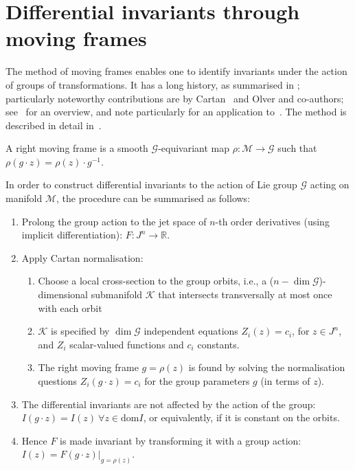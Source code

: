 \documentclass[review,onefignum,onetabnum]{siamonline190516}
\begin{document}
\section{Differential invariants through moving frames}

The method of moving frames enables one to identify invariants under the action of groups of transformations. It has a long history, as summarised in \cite{Olver14}; particularly noteworthy contributions are by Cartan~\cite{Cartan37} and Olver and co-authors; see~\cite{Olver14} for an overview, and note particularly for an application to~\cite{Calabi98}. The method is described in detail in~\cite{OlverCIT}.

A right moving frame is a smooth $\mathcal{G}$-equivariant map $\rho : \mathcal{M} \to \mathcal{G}$ such that $\rho (g \cdot z) = \rho(z) \cdot g^{-1}$. 

In order to construct differential invariants to the action of Lie group $\mathcal{G}$ acting on manifold $\mathcal{M}$, the procedure can be summarised as follows:

\begin{enumerate}
\item Prolong the group action to the jet space of $n$-th order derivatives (using implicit differentiation): $F: J^n \to \mathbb{R}$. 
\item Apply Cartan normalisation:
    \begin{enumerate}
    \item Choose a local cross-section to the group orbits, i.e., a ($n - \dim \mathcal{G}$)-dimensional submanifold $\mathcal{K}$ that intersects transversally at most once with each orbit
    \item $\mathcal{K}$ is specified by $\dim \mathcal{G}$ independent equations $Z_i (z) = c_i$, for $z \in J^n$,  and $Z_i$ scalar-valued functions and $c_i$ constants.
    \item The right moving frame $g = \rho(z)$ is found by solving the normalisation questions $Z_i (g \cdot z) = c_i$ for the group parameters $g$ (in terms of $z$).
    \end{enumerate}
\item The differential invariants are not affected by the action of the group: $I(g \cdot z) = I(z) \: \forall z \in \mathrm{dom} I$, or equivalently, if it is constant on the orbits. 
\item Hence $F$ is made invariant by transforming it with a group action: $I(z) = F(g \cdot z) |_{g=\rho(z)}$.  
\end{enumerate}
\end{document}
